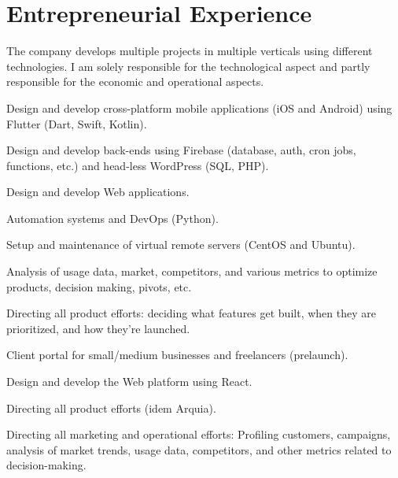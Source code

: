 \documentclass[]{robertino-cv}
\begin{document}
\begin{minipage}[t]{0.50\textwidth} 


\section{Entrepreneurial Experience}

The company develops multiple projects in multiple verticals using different technologies. I am solely responsible for the technological aspect and partly responsible for the economic and operational aspects.
\vspace{\topsep} %
\begin{tightemize}
\item Design and develop cross-platform mobile applications (iOS and Android) using Flutter (Dart, Swift, Kotlin).
\item Design and develop back-ends using Firebase (database, auth, cron jobs, functions, etc.) and head-less WordPress (SQL, PHP). 
\item Design and develop Web applications.
\item Automation systems and DevOps (Python).
\item Setup and maintenance of virtual remote servers (CentOS and Ubuntu).
\item Analysis of usage data, market, competitors, and various metrics to optimize products, decision making, pivots, etc.
\item Directing all product efforts: deciding what features get built, when they are prioritized, and how they're launched.
\end{tightemize}
\sectionsep


Client portal for small/medium businesses and freelancers (prelaunch).
\begin{tightemize}
\item Design and develop the Web platform using React.
\item Directing all product efforts (idem Arquia).
\item Directing all marketing and operational efforts: Profiling customers, campaigns, analysis of market trends, usage data, competitors, and other metrics related to decision-making.
\end{tightemize}
\sectionsep



\end{minipage}
\end{document}
